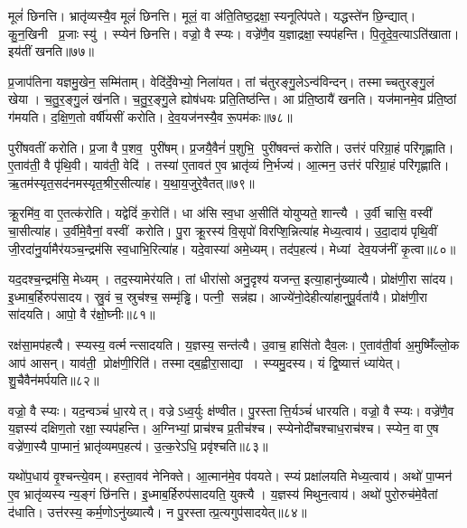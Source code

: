 मूलं॑ छिनत्ति।
भ्रातृ॑व्यस्यै॒व मूलं॑ छिनत्ति।
मूलं॒ वा अ॑ति॒तिष्ठ॒द्रक्षा॒स्यनूत्पि॑पते।
यद्धस्ते॑न छि॒न्द्यात्।
कु॒न॒खिनी प्र॒जाः स्यु॑।
स्प्येन॑ छिनत्ति।
वज्रो॒ वै स्प्यः।
वज्रे॑णै॒व य॒ज्ञाद्रक्षा॒स्यप॑हन्ति।
पि॒तृ॒दे॒व॒त्याऽति॑खाता।
इय॑तीं खनति॥७७॥

प्र॒जाप॑तिना यज्ञमु॒खेन॒ सम्मि॑ताम्।
वेदि॑र्दे॒वेभ्यो॒ निला॑यत।
तां च॑तुरङ्गु॒लेऽन्व॑विन्दन्।
तस्माच्चतुरङ्गु॒लं खेया।
च॒तु॒र॒ङ्गु॒लं ख॑नति।
च॒तु॒र॒ङ्गु॒ले ह्योष॑धयः प्रति॒तिष्ठ॑न्ति।
आ प्र॑ति॒ष्ठायै॑ खनति।
यज॑मानमे॒व प्र॑ति॒ष्ठां ग॑मयति।
द॒क्षि॒ण॒तो वर्\mbox{}षी॑यसीं करोति।
दे॒व॒यज॑नस्यै॒व रू॒पम॑कः॥७८॥

पुरी॑षवतीं करोति।
प्र॒जा वै प॒शव॒ पुरी॑षम्।
प्र॒जयै॒वैनं॑ प॒शुभि॒ पुरी॑षवन्तं करोति।
उत्त॑रं परिग्रा॒हं परि॑गृह्णाति।
ए॒ताव॑ती॒ वै पृ॑थि॒वी।
याव॑ती॒ वेदि॑।
तस्या॑ ए॒तावत॑ ए॒व भ्रातृ॑व्यं नि॒र्भज्य॑।
आ॒त्मन॒ उत्त॑रं परिग्रा॒हं परि॑गृह्णाति।
ऋ॒तम॑स्यृत॒सद॑नमस्यृत॒श्रीर॒सीत्या॑ह।
य॒था॒य॒जुरे॒वैतत्॥७९॥

क्रू॒रमि॑व॒ वा ए॒तत्क॑रोति।
यद्वेदिं॑ क॒रोति॑।
धा अ॑सि स्व॒धा अ॒सीति॑ योयुप्यते॒ शान्त्यै।
उ॒र्वी चासि॒ वस्वी॑ चा॒सीत्या॑ह।
उ॒र्वीमे॒वैनां॒ वस्वीं करोति।
पु॒रा क्रू॒रस्य॑ वि॒सृपो॑ विरप्शि॒न्नित्या॑ह मेध्य॒त्वाय॑।
उ॒दा॒दाय॑ पृथि॒वीं जी॒रदा॑नु॒र्यामैर॑यञ्च॒न्द्रम॑सि स्व॒धाभि॒रित्या॑ह।
यदे॒वास्या॑ अमे॒ध्यम्।
तद॑प॒हत्य॑।
मेध्यां देव॒यज॑नीं कृ॒त्वा॥८०॥

यद॒दश्च॒न्द्रम॑सि॒ मेध्यम्।
तद॒स्यामेर॑यति।
तां धीरा॑सो अनु॒दृश्य॑ यजन्त॒ इत्या॒हानु॑ख्यात्यै।
प्रोक्ष॑णी॒रा सा॑दय।
इ॒ध्माब॒र्\mbox{}हिरुप॑सादय।
स्रु॒वं च॒ स्रुच॑श्च॒ सम्मृ॑ड्ढि।
पत्नी॒ सन्न॑ह्य।
आज्ये॑नो॒देहीत्या॑हानुपू॒र्वता॑यै।
प्रोक्ष॑णी॒रा सा॑दयति।
आपो॒ वै र॑क्षो॒घ्नीः॥८१॥

रक्ष॑सा॒मप॑हत्यै।
स्प्यस्य॒ वर्त्मन्त्सादयति।
य॒ज्ञस्य॒ सन्त॑त्यै।
उ॒वाच॒ हासि॑तो दैव॒लः।
ए॒ताव॑ती॒र्वा अ॒मुष्मिँ॑ल्लो॒क आप॑ आसन्।
याव॑ती॒ प्रोक्ष॑णी॒रिति॑।
तस्माद्ब॒ह्वीरा॒साद्या।
स्प्यमु॒दस्य\sn{}।
यं द्वि॒ष्यात्तं ध्या॑येत्।
शु॒चैवैन॑मर्पयति॥८२॥

वज्रो॒ वै स्प्यः।
यद॒न्वञ्चं॑ धा॒रयेत्।
वज्रेऽध्व॒र्युः क्ष॑ण्वीत।
पु॒रस्तात्ति॒र्यञ्चं॑ धारयति।
वज्रो॒ वै स्प्यः।
वज्रे॑णै॒व य॒ज्ञस्य॑ दक्षिण॒तो रक्षा॒स्यप॑हन्ति।
अ॒ग्निभ्यां॒ प्राच॑श्च प्र॒तीच॑श्च।
स्प्येनोदी॑चश्चाध॒राच॑श्च।
स्प्येन॒ वा ए॒ष वज्रे॑णा॒स्यै पा॒प्मानं॒ भ्रातृ॑व्यमप॒हत्य॑।
उ॒त्क॒रेऽधि॒ प्रवृ॑श्चति॥८३॥

यथो॑प॒धाय॑ वृ॒श्चन्त्ये॒वम्।
हस्ता॒वव॑ नेनिक्ते।
आ॒त्मान॑मे॒व प॑वयते।
स्प्यं प्रक्षा॑लयति मेध्य॒त्वाय॑।
अथो॑ पा॒प्मन॑ ए॒व भ्रातृ॑व्यस्य न्य॒ङ्गं छि॑नत्ति।
इ॒ध्माब॒र्\mbox{}हिरुप॑सादयति॒ युक्त्यै।
य॒ज्ञस्य॑ मिथुन॒त्वाय॑।
अथो॑ पुरो॒रुच॑मे॒वैतां द॑धाति।
उत्त॑रस्य॒ कर्म॒णोऽनु॑ख्यात्यै।
न पु॒रस्तात्प्र॒त्यगुप॑सादयेत्॥८४॥

